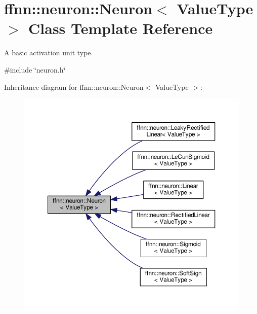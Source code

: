 \hypertarget{classffnn_1_1neuron_1_1_neuron}{\section{ffnn\-:\-:neuron\-:\-:Neuron$<$ Value\-Type $>$ Class Template Reference}
\label{classffnn_1_1neuron_1_1_neuron}
}


A basic activation unit type.  




{\ttfamily \#include \char`\"{}neuron.\-h\char`\"{}}



Inheritance diagram for ffnn\-:\-:neuron\-:\-:Neuron$<$ Value\-Type $>$\-:
\nopagebreak
\begin{figure}[H]
\begin{center}
\leavevmode
\includegraphics[width=350pt]{classffnn_1_1neuron_1_1_neuron__inherit__graph}
\end{center}
\end{figure}
